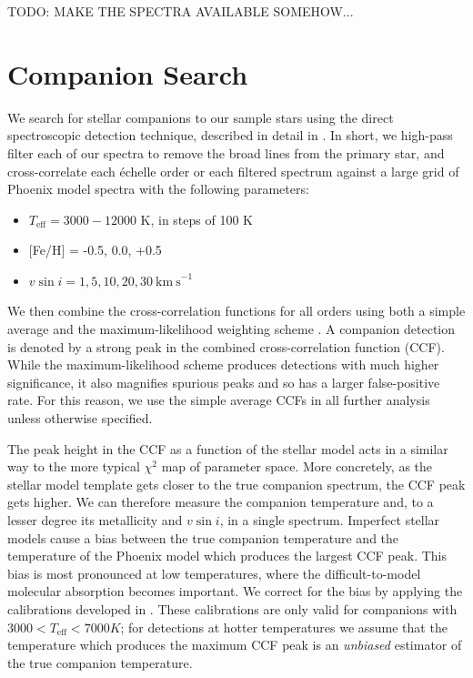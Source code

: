 \documentclass{emulateapj}
\begin{document}
TODO: MAKE THE SPECTRA AVAILABLE SOMEHOW...



\section{Companion Search}
\label{sec:companions}

We search for stellar companions to our sample stars using the direct spectroscopic detection technique, described in detail in \citet{Gullikson2016}. In short, we high-pass filter each of our spectra to remove the broad lines from the primary star, and cross-correlate each \'echelle order or each filtered spectrum against a large grid of Phoenix model spectra \citep{Husser2013_b} with the following parameters:

\begin{itemize}
\item $T_\mathrm{eff} = 3000-12000$ K, in steps of 100 K
\item {[}Fe/H{]} = -0.5, 0.0, +0.5
\item $v\sin{i} = 1, 5, 10, 20, 30 \ \mathrm{km\ s}^{-1}$
\end{itemize}

We then combine the cross-correlation functions for all orders using both a simple average and the maximum-likelihood weighting scheme \citep{Zucker2003}. A companion detection is denoted by a strong peak in the combined cross-correlation function (CCF). While the maximum-likelihood scheme produces detections with much higher significance, it also magnifies spurious peaks and so has a larger false-positive rate. For this reason, we use the simple average CCFs in all further analysis unless otherwise specified.

The peak height in the CCF as a function of the stellar model acts in a similar way to the more typical $\chi^2$ map of parameter space. More concretely, as the stellar model template gets closer to the true companion spectrum, the CCF peak gets higher. We can therefore measure the companion temperature and, to a lesser degree its metallicity and $v\sin{i}$, in a single spectrum. Imperfect stellar models cause a bias between the true companion temperature and the temperature of the Phoenix model which produces the largest CCF peak. This bias is most pronounced at low temperatures, where the difficult-to-model molecular absorption becomes important. We correct for the bias by applying the calibrations developed in \citet{Gullikson2016}. These calibrations are only valid for companions with $3000 < T_\mathrm{eff} < 7000 K$; for detections at hotter temperatures we assume that the temperature which produces the maximum CCF peak is an \emph{unbiased} estimator of the true companion temperature.
\end{document}
